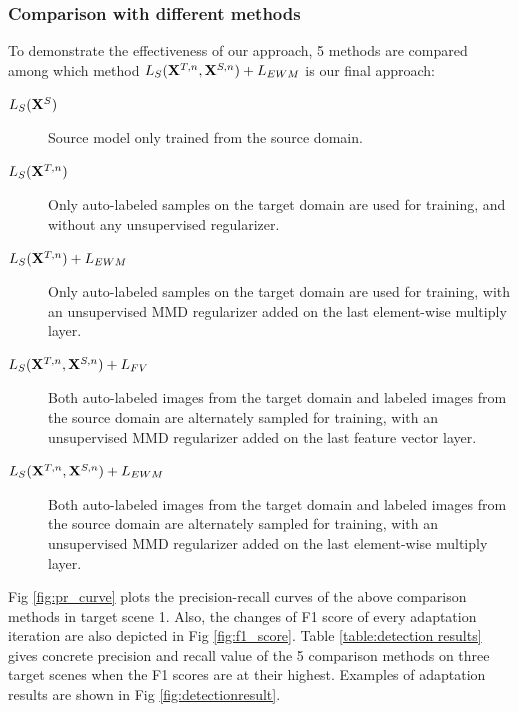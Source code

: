 \documentclass[runningheads]{llncs}
\begin{document}
\subsubsection{Comparison with different methods}
To demonstrate the effectiveness of our approach, 5 methods are compared among which method $L_{S}({\bf X}^{T,n},{\bf X}^{S,n})+L_{EWM}$ is our final approach:
\begin{description}
  \item[$L_{S}({\bf X}^{S})$] Source model only trained from the source domain.
  \item[$L_{S}({\bf X}^{T,n})$] Only auto-labeled samples on the target domain are used for training, and without any unsupervised regularizer.
  \item[$L_{S}({\bf X}^{T,n})+L_{EWM}$] Only auto-labeled samples on the target domain are used for training, with an unsupervised MMD regularizer added on the last element-wise multiply layer.
  \item[$L_{S}({\bf X}^{T,n},{\bf X}^{S,n})+L_{FV}$\cite{tzeng2014deep}] Both auto-labeled images from the target domain and labeled images from the source domain are alternately sampled for training, with an unsupervised MMD regularizer added on the last feature vector layer.
  \item[$L_{S}({\bf X}^{T,n},{\bf X}^{S,n})+L_{EWM}$] Both auto-labeled images from the target domain and labeled images from the source domain are alternately sampled for training, with an unsupervised MMD regularizer added on the last element-wise multiply layer.
\end{description}
Fig \ref{fig:pr_curve} plots the precision-recall curves of the above comparison methods in target scene 1. Also, the changes of F1 score of every adaptation iteration are also depicted in Fig \ref{fig:f1_score}. Table \ref{table:detection results} gives concrete precision and recall value of the 5 comparison methods on three target scenes when the F1 scores are at their highest. Examples of adaptation results are shown in Fig \ref{fig:detectionresult}.
\end{document}
